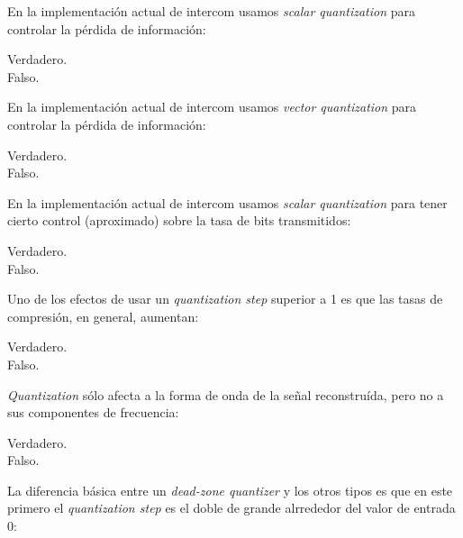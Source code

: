 \documentclass[legalpaper, 12pt, addpoints]{exam}
\begin{document}
\begin{questions}
\question En la implementación actual de intercom usamos \emph{scalar quantization} para controlar la pérdida de información:

\begin{oneparchoices}
  \choice Verdadero.\\
  \choice Falso.
\end{oneparchoices}
  
\vspace{0.10in}

\question En la implementación actual de intercom usamos \emph{vector quantization} para controlar la pérdida de información:

\begin{oneparchoices}
  \choice Verdadero.\\
  \choice Falso.
\end{oneparchoices}
  
\vspace{0.10in}

\question En la implementación actual de intercom usamos \emph{scalar
  quantization} para tener cierto control (aproximado) sobre la tasa
de bits transmitidos:

\begin{oneparchoices}
  \choice Verdadero.\\
  \choice Falso.
\end{oneparchoices}
  
\vspace{0.10in}

\question Uno de los efectos de usar un \emph{quantization step} superior a 1 es que las tasas de compresión, en general, aumentan:

\begin{oneparchoices}
  \choice Verdadero.\\
  \choice Falso.
\end{oneparchoices}
  
\vspace{0.10in}

\question \emph{Quantization} sólo afecta a la forma de onda de la señal
reconstruída, pero no a sus componentes de frecuencia:

\begin{oneparchoices}
  \choice Verdadero.\\
  \choice Falso.
\end{oneparchoices}
  
\vspace{0.10in}

\question La diferencia básica entre un \emph{dead-zone quantizer} y
los otros tipos es que en este primero el \emph{quantization step} es el
doble de grande alrrededor del valor de entrada 0:


\end{questions}
\end{document}
